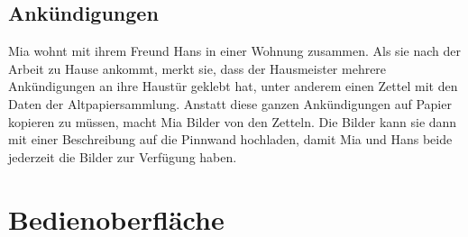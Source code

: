 \documentclass[a4paper]{scrreprt}
\begin{document}
        \subsection{Ankündigungen}
        Mia wohnt mit ihrem Freund Hans in einer Wohnung zusammen. Als sie nach der Arbeit zu Hause ankommt, merkt sie, dass der Hausmeister mehrere Ankündigungen an ihre Haustür geklebt hat, unter anderem einen Zettel mit den Daten der Altpapiersammlung.
        Anstatt diese ganzen Ankündigungen auf Papier kopieren zu müssen, macht Mia Bilder von den Zetteln. Die Bilder kann sie dann mit einer Beschreibung auf die Pinnwand hochladen, damit Mia und Hans beide jederzeit die Bilder zur Verfügung haben.
        

        \newpage
			
        	
        	\newpage
        \section{Bedienoberfläche}
        
\end{document}
